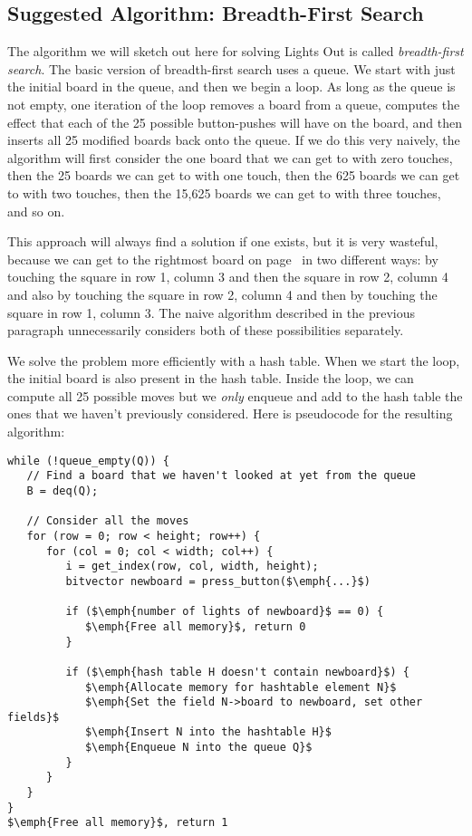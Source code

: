 \documentclass[12pt]{exam}
\begin{document}
\clearpage
\subsection{Suggested Algorithm: Breadth-First Search}
\label{sec:bfs}

The algorithm we will sketch out here for solving Lights Out is called
\emph{breadth-first search}.  The basic version of breadth-first
search uses a queue. We start with just the initial board in the
queue, and then we begin a loop. As long as the queue is not empty,
one iteration of the loop removes a board from a queue, computes the
effect that each of the 25 possible button-pushes will have on the
board, and then inserts all 25 modified boards back onto the queue. If
we do this very naively, the algorithm will first consider the one
board that we can get to with zero touches, then the 25 boards we can get
to with one touch, then the 625 boards we can get to with two touches,
then the 15,625 boards we can get to with three touches, and so on.

This approach will always find a solution if one exists, but it is
very wasteful, because we can get to the rightmost board on
page~\pageref{sec:intro} in two different ways: by touching the square
in row 1, column 3 and then the square in row 2, column 4 and also by
touching the square in row 2, column 4 and then by touching the square
in row 1, column 3.  The naive algorithm described in the previous
paragraph unnecessarily considers both of these possibilities
separately.

We solve the problem more efficiently with a hash table. When we start
the loop, the initial board is also present in the hash table. Inside
the loop, we can compute all 25 possible moves but we \emph{only}
enqueue and add to the hash table the ones that we haven't previously
considered. Here is pseudocode for the resulting algorithm:

\medskip
\begin{lstlisting}[language={[coin]C}, deletestring={[b]{'}}]
while (!queue_empty(Q)) {
   // Find a board that we haven't looked at yet from the queue
   B = deq(Q);

   // Consider all the moves
   for (row = 0; row < height; row++) {
      for (col = 0; col < width; col++) {
         i = get_index(row, col, width, height);
         bitvector newboard = press_button($\emph{...}$)

         if ($\emph{number of lights of newboard}$ == 0) {
            $\emph{Free all memory}$, return 0
         }

         if ($\emph{hash table H doesn't contain newboard}$) {
            $\emph{Allocate memory for hashtable element N}$
            $\emph{Set the field N->board to newboard, set other fields}$
            $\emph{Insert N into the hashtable H}$
            $\emph{Enqueue N into the queue Q}$
         }
      }
   }
}
$\emph{Free all memory}$, return 1
\end{lstlisting}
\end{document}
